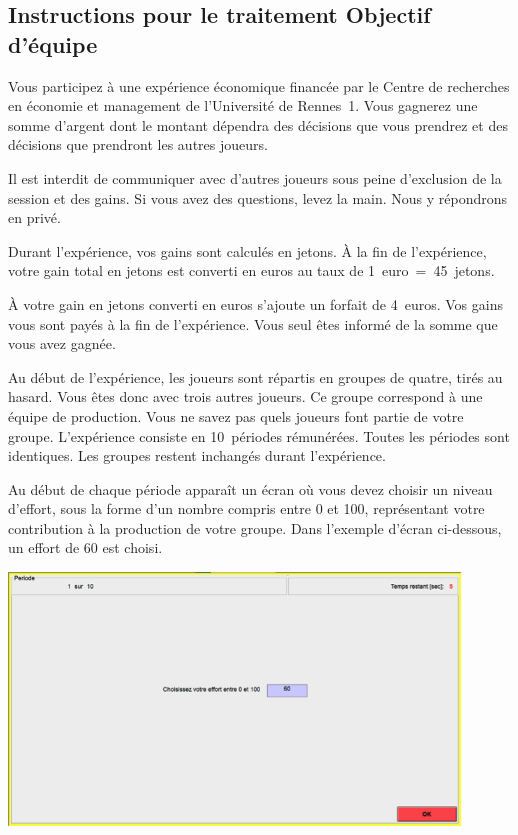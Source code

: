 \begin{Article}
\begin{refsection}[Lebourges]
\begin{appendices}
\subsection{Instructions pour le traitement Objectif d'équipe}

Vous participez à une expérience économique financée par le Centre de
recherches en économie et management de l'Université de Rennes~1. Vous
gagnerez une somme d'argent dont le montant dépendra des décisions que
vous prendrez et des décisions que prendront les autres joueurs.

Il est interdit de communiquer avec d'autres joueurs sous peine
d'exclusion de la session et des gains. Si vous avez des questions,
levez la main. Nous y répondrons en privé.

Durant l'expérience, vos gains sont calculés en jetons. À la fin de
l'expérience, votre gain total en jetons est converti en euros au taux
de 1~euro~=~45~jetons.

À votre gain en jetons converti en euros s'ajoute un forfait de 4~euros.
Vos gains vous sont payés à la fin de l'expérience. Vous seul êtes
informé de la somme que vous avez gagnée.

Au début de l'expérience, les joueurs sont répartis en groupes de
quatre, tirés au hasard. Vous êtes donc avec trois autres joueurs. Ce
groupe correspond à une équipe de production. Vous ne savez pas quels
joueurs font partie de votre groupe. L'expérience consiste en
10~périodes rémunérées. Toutes les périodes sont identiques. Les groupes
restent inchangés durant l'expérience.

Au début de chaque période apparaît un écran où vous devez choisir un
niveau d'effort, sous la forme d'un nombre compris entre 0 et 100,
représentant votre contribution à la production de votre groupe. Dans
l'exemple d'écran ci-dessous, un effort de 60 est choisi.

\vspace{0,2cm}

\includegraphics[width = 0.9\textwidth]{05_fig9-annexII.png}


\end{appendices}
\end{refsection}
\end{Article}
